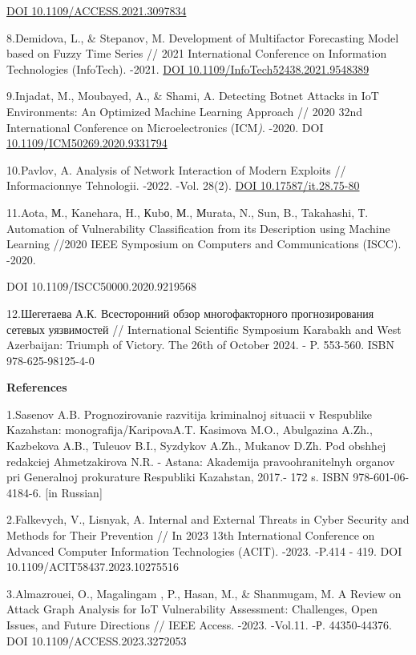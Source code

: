\documentclass[
]{article}
\begin{document}
\href{https://doi.org/10.1109/ACCESS.2021.3097834}{DOI
10.1109/ACCESS.2021.3097834}

8.Demidova, L., \& Stepanov, M. Development of Multifactor Forecasting
Model based on Fuzzy Time Series // 2021 International Conference on
Information Technologies (InfoTech). -2021.
\href{https://doi.org/10.1109/InfoTech52438.2021.9548389}{DOI
10.1109/InfoTech52438.2021.9548389}

9.Injadat, M., Moubayed, A., \& Shami, A. Detecting Botnet Attacks in
IoT Environments: An Optimized Machine Learning Approach // 2020 32nd
International Conference on Microelectronics (ICM\emph{)}. -2020. DOI
\href{https://doi.org/10.1109/ICM50269.2020.9331794}{10.1109/ICM50269.2020.9331794}

10.Pavlov, A. Analysis of Network Interaction of Modern Exploits //
Informacionnye Tehnologii. -2022. -Vol. 28(2).
\href{https://doi.org/10.17587/it.28.75-80}{DOI 10.17587/it.28.75-80}

11.Aota, М., Kanehara, H., Кubо, М., Мurata, N., Sun, B., Takahashi, Т.
Automation of Vulnerability Classification from its Description using
Machine Learning //2020 IEEE Symposium on Computers and Communications
(ISCC). -2020.

DOI 10.1109/ISCC50000.2020.9219568

12.Шегетаева А.К. Всесторонний обзор многофакторного прогнозирования
сетевых уязвимостей // International Scientific Symposium Karabakh and
West Azerbaijan: Triumph of Victory. The 26th of October 2024. - P.
553-560. ISBN 978-625-98125-4-0

\textbf{References}

1.Sasenov A.B. Prognozirovanie razvitija kriminal\textquotesingle noj
situacii v Respublike Kazahstan: monografija/KaripovaA.T. Kasimova M.O.,
Abulgazina A.Zh., Kazbekova A.B., Tuleuov B.I., Syzdykov A.Zh., Mukanov
D.Zh. Pod obshhej redakciej Ahmetzakirova N.R. - Astana: Akademija
pravoohranitel\textquotesingle nyh organov pri
General\textquotesingle noj prokurature Respubliki Kazahstan, 2017.- 172
s. ISBN 978-601-06-4184-6. {[}in Russian{]}

2.Falkevych, V., Lisnyak, A. Internal and External Threats in Cyber
Security and Methods for Their Prevention // In 2023 13th International
Conference on Advanced Computer Information Technologies (ACIT). -2023.
-P.414 - 419. DOI 10.1109/ACIT58437.2023.10275516

3.Almazrouei, O., Magalingam , P., Hasan, M., \& Shanmugam, M. A Review
on Attack Graph Analysis for IoT Vulnerability Assessment: Challenges,
Open Issues, and Future Directions // IEEE Access. -2023. -Vol.11. -Р.
44350-44376. DOI 10.1109/ACCESS.2023.3272053
\end{document}
